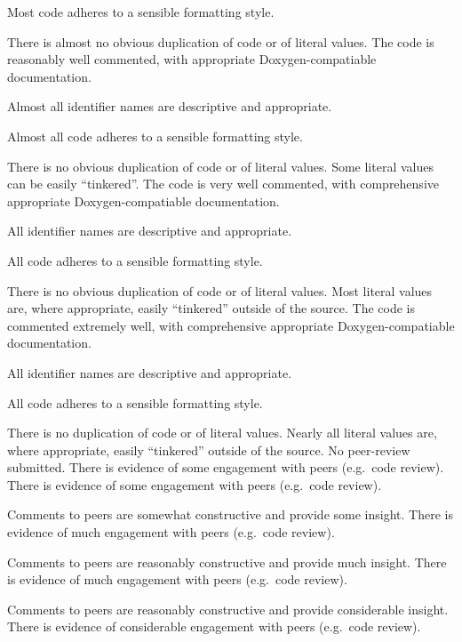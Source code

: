 \documentclass{../../fal_assignment}
\begin{document}
\begin{markingrubric}
            \par Most code adheres to a sensible formatting style.
             \par There is almost no obvious duplication of code or of literal values.   
        \grade The code is reasonably well commented, with appropriate Doxygen-compatiable documentation.
            \par Almost all identifier names are descriptive and appropriate.
            \par Almost all code adheres to a sensible formatting style.
             \par There is no obvious duplication of code or of literal values. Some literal values can be easily ``tinkered''. 
        \grade The code is very well commented, with comprehensive appropriate Doxygen-compatiable documentation.
            \par All identifier names are descriptive and appropriate.
            \par All code adheres to a sensible formatting style.
             \par There is no obvious duplication of code or of literal values. Most literal values are, where appropriate, easily ``tinkered'' outside of the source.  
        \grade The code is commented extremely well, with comprehensive appropriate Doxygen-compatiable documentation.
            \par All identifier names are descriptive and appropriate.
            \par All code adheres to a sensible formatting style.
            \par There is no duplication of code or of literal values. Nearly all literal values are, where appropriate, easily ``tinkered'' outside of the source.  
%
		\grade\fail No peer-review submitted.
		\grade There is evidence of some engagement with peers (e.g.\ code review).
		\grade There is evidence of some engagement with peers (e.g.\ code review).
		\par Comments to peers are somewhat constructive and provide some insight.
		\grade There is evidence of much engagement with peers (e.g.\ code review).
		\par Comments to peers are reasonably constructive and provide much insight.
		\grade There is evidence of much engagement with peers (e.g.\ code review).
		\par Comments to peers are reasonably constructive and provide considerable insight.
		\grade There is evidence of considerable engagement with peers (e.g.\ code review).

\end{markingrubric}
\end{document}
